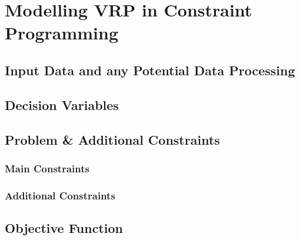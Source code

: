 \chapter{Modelling VRP in Constraint Programming}
\section{Input Data and any Potential Data Processing}
\section{Decision Variables}
\section{Problem \& Additional Constraints}
\subsection{Main Constraints}
\subsection{Additional Constraints}
\section{Objective Function}